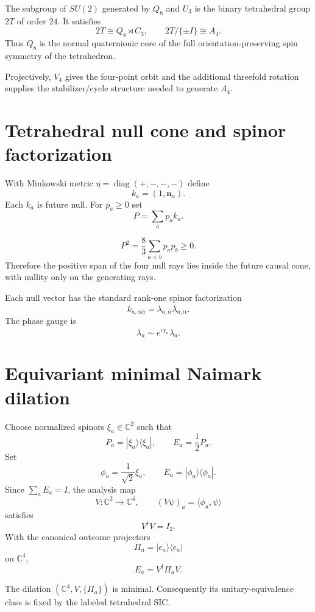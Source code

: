 \begin{theorem}\label{thm:binary-tetra}
The subgroup of $SU(2)$ generated by $Q_8$ and $U_3$ is the binary tetrahedral group $2T$ of order $24$. It satisfies
\[
\boxed{
2T\cong Q_8\rtimes C_3,
\qquad
2T/\{\pm I\}\cong A_4.
}
\]
Thus $Q_8$ is the normal quaternionic core of the full orientation-preserving spin symmetry of the tetrahedron.
\end{theorem}

Projectively, $V_4$ gives the four-point orbit and the additional threefold rotation supplies the stabilizer/cycle structure needed to generate $A_4$.

\section{Tetrahedral null cone and spinor factorization}

With Minkowski metric $\eta=\operatorname{diag}(+,-,-,-)$ define
\[
k_a=(1,\mathbf n_a).
\]
Each $k_a$ is future null. For $p_a\ge0$ set
\[
P=\sum_ap_ak_a.
\]

\begin{theorem}\label{thm:cone}
\[
\boxed{
P^2
=
\frac83\sum_{a<b}p_ap_b
\ge0.
}
\]
Therefore the positive span of the four null rays lies inside the future causal cone, with nullity only on the generating rays.
\end{theorem}

Each null vector has the standard rank-one spinor factorization
\[
k_{a,\alpha\dot\alpha}
=
\lambda_{a,\alpha}
\overline{\lambda}_{a,\dot\alpha}.
\]
The phase gauge is
\[
\lambda_a\sim e^{i\chi_a}\lambda_a.
\]

\section{Equivariant minimal Naimark dilation}

Choose normalized spinors $\xi_a\in\mathbb C^2$ such that
\[
P_a=|\xi_a\rangle\langle\xi_a|,
\qquad
E_a=\frac12P_a.
\]
Set
\[
\phi_a=\frac1{\sqrt2}\xi_a,
\qquad
E_a=|\phi_a\rangle\langle\phi_a|.
\]
Since $\sum_aE_a=I$, the analysis map
\[
\boxed{
V:\mathbb C^2\longrightarrow\mathbb C^4,
\qquad
(V\psi)_a=\langle\phi_a,\psi\rangle
}
\]
satisfies
\[
V^\dagger V=I_2.
\]
With the canonical outcome projectors
\[
\Pi_a=|e_a\rangle\langle e_a|
\]
on $\mathbb C^4$,
\[
\boxed{E_a=V^\dagger\Pi_aV.}
\]

\begin{theorem}\label{thm:naimark}
The dilation $(\mathbb C^4,V,\{\Pi_a\})$ is minimal. Consequently its unitary-equivalence class is fixed by the labeled tetrahedral SIC.
\end{theorem}

